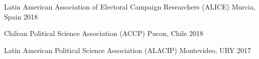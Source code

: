 \begin{cvhonors}
\cvconf
{Latin American Association of Electoral Campaign Researchers (ALICE)} 
{Murcia, Spain}
{2018}
\end{cvhonors}

\begin{cvhonors}
\cvconf
{Chilean Political Science Association (ACCP)} 
{Pucon, Chile}
{2018}
\end{cvhonors}

\begin{cvhonors}
\cvconf
{Latin American Political Science Association (ALACIP)} 
{Montevideo, URY}
{2017}
\end{cvhonors}










